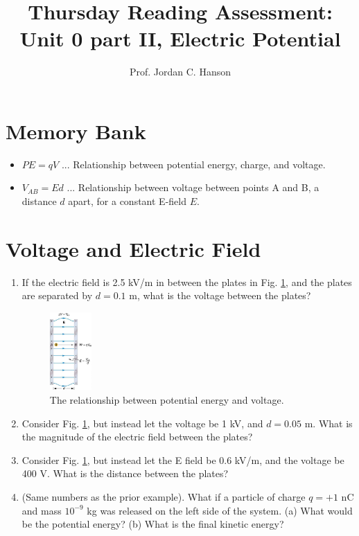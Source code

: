 \documentclass{article}
\begin{document}
\title{Thursday Reading Assessment: Unit 0 part II, Electric Potential}
\author{Prof. Jordan C. Hanson}

\maketitle

\section{Memory Bank}

\begin{itemize}
\item $PE = q V$ ... Relationship between potential energy, charge, and voltage.
\item $V_{AB} = Ed$ ... Relationship between voltage between points A and B, a distance $d$ apart, for a constant E-field $E$.
\end{itemize}

\section{Voltage and Electric Field}

\begin{enumerate}
\item If the electric field is 2.5 kV/m in between the plates in Fig. \ref{fig:plates}, and the plates are separated by $d = 0.1$ m, what is the voltage between the plates? \\ \vspace{1cm}
\begin{figure}[ht]
\centering
\includegraphics[width=0.15\textwidth]{plates.jpeg}
\caption{\label{fig:plates} The relationship between potential energy and voltage.}
\end{figure}
\item Consider Fig. \ref{fig:plates}, but instead let the voltage be 1 kV, and $d = 0.05$ m.  What is the magnitude of the electric field between the plates? \\ \vspace{1cm}
\item Consider Fig. \ref{fig:plates}, but instead let the E field be 0.6 kV/m, and the voltage be 400 V.  What is the distance between the plates? \\ \vspace{1cm}
\item (Same numbers as the prior example).  What if a particle of charge $q = +1$ nC and mass $10^{-9}$ kg was released on the left side of the system.  (a) What would be the potential energy?  (b) What is the final kinetic energy?
\end{enumerate}
\end{document}
